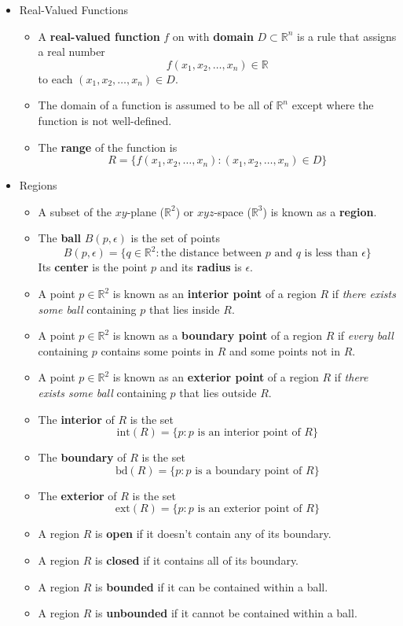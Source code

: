 \documentclass[12pt]{article}
\newcommand{\<}{\left<}
\renewcommand{\>}{\right>}
\begin{document}
\begin{itemize}

  \item Real-Valued Functions

    \begin{itemize}
      \item A \textbf{real-valued function} $f$ on with \textbf{domain} $D \subset \mathbb{R}^n$ is a rule that assigns a real number \[f(x_1,x_2,\dots,x_n) \in \mathbb{R}\] to each $(x_1,x_2,\dots,x_n) \in D$.
      \item The domain of a function is assumed to be all of $\mathbb{R}^n$ except where the function is not well-defined.
      \item The \textbf{range} of the function is \[R = \{f(x_1,x_2,\dots,x_n) : (x_1,x_2,\dots,x_n) \in D\}\]
    \end{itemize}
  
  \item Regions
  
    \begin{itemize}
      \item A subset of the $xy$-plane ($\mathbb{R}^2$) or $xyz$-space ($\mathbb{R}^3$) is known as a \textbf{region}.
      \item The \textbf{ball} $B(p,\epsilon)$ is the set of points \[B(p,\epsilon) = \{q \in \mathbb{R}^2 : \text{the distance between }p\text{ and }q\text{ is less than }\epsilon\}\] Its \textbf{center} is the point $p$ and its \textbf{radius} is $\epsilon$.
      \item A point $p\in\mathbb{R}^2$ is known as an \textbf{interior point} of a region $R$ if \textit{there exists some ball} containing $p$ that lies inside $R$.
      \item A point $p\in\mathbb{R}^2$ is known as a \textbf{boundary point} of a region $R$ if \textit{every ball} containing $p$ contains some points in $R$ and some points not in $R$.
      \item A point $p\in\mathbb{R}^2$ is known as an \textbf{exterior point} of a region $R$ if \textit{there exists some ball} containing $p$ that lies outside $R$.
      \item The \textbf{interior} of $R$ is the set \[\textrm{int}(R)=\{p : p \text{ is an interior point of } R\}\]
      \item The \textbf{boundary} of $R$ is the set \[\textrm{bd}(R)=\{p : p \text{ is a boundary point of } R\}\]
      \item The \textbf{exterior} of $R$ is the set \[\textrm{ext}(R)=\{p : p \text{ is an exterior point of } R\}\]
      \item A region $R$ is \textbf{open} if it doesn't contain any of its boundary.
      \item A region $R$ is \textbf{closed} if it contains all of its boundary.
      \item A region $R$ is \textbf{bounded} if it can be contained within a ball.
      \item A region $R$ is \textbf{unbounded} if it cannot be contained within a ball.
    \end{itemize}


\end{itemize}
\end{document}
